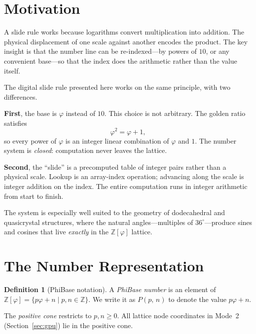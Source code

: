\documentclass[12pt]{article}
\theoremstyle{definition}
\newtheorem{definition}[theorem]{Definition}
\theoremstyle{remark}
\newcommand{\Z}{\mathbb{Z}}
\newcommand{\Zphi}{\mathbb{Z}[\varphi]}
\newcommand{\Phib}[2]{P(#1,\,#2)}
\begin{document}
\tableofcontents
\newpage

\section{Motivation}

A slide rule works because logarithms convert multiplication into
addition.  The physical displacement of one scale against another
encodes the product.  The key insight is that the number line can be
re-indexed---by powers of $10$, or any convenient base---so that the
index does the arithmetic rather than the value itself.

The digital slide rule presented here works on the same principle,
with two differences.

\medskip
\noindent\textbf{First}, the base is $\varphi$ instead of $10$.
This choice is not arbitrary.  The golden ratio satisfies
\[
  \varphi^{2} = \varphi + 1,
\]
so every power of $\varphi$ is an integer linear combination of
$\varphi$ and $1$.  The number system is \emph{closed}: computation
never leaves the lattice.

\medskip
\noindent\textbf{Second}, the ``slide'' is a precomputed table of
integer pairs rather than a physical scale.  Lookup is an array-index
operation; advancing along the scale is integer addition on the index.
The entire computation runs in integer arithmetic from start to finish.

The system is especially well suited to the geometry of dodecahedral
and quasicrystal structures, where the natural angles---multiples of
$36^\circ$---produce sines and cosines that live \emph{exactly} in the
$\Zphi$ lattice.

\section{The Number Representation}

\begin{definition}[PhiBase notation]
A \emph{PhiBase number} is an element of $\Zphi = \{p\varphi + n \mid
p,n\in\Z\}$.  We write it as $\Phib{p}{n}$ to denote the value
$p\varphi + n$.
\end{definition}

The \emph{positive cone} restricts to $p,n \geq 0$.  All lattice
node coordinates in Mode~2 (Section~\ref{sec:gpu}) lie in the
positive cone.
\end{document}
